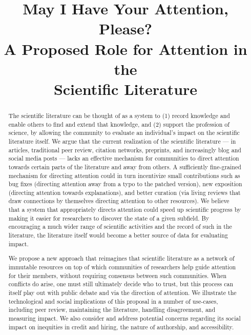 \documentclass{article} %
\title{May I Have Your Attention, Please? \\
A Proposed Role for Attention in the \\ Scientific Literature}
\begin{document}
\maketitle

\begin{abstract}
The scientific literature can be thought of as a system to 
(1) record knowledge and enable others to find and extend that knowledge, and 
(2) support the profession of science, by allowing the community to evaluate an individual's impact on the scientific literature itself.
%
We argue that the current realization of the scientific literature --- in articles, traditional peer review, citation networks, preprints, and increasingly blog and social media posts --- lacks an
effective mechanism for communities to direct attention towards certain parts of the literature and away from others. 
%
A sufficiently fine-grained mechanism for directing attention could in turn incentivize small contributions such as 
bug fixes 
(directing attention away from a typo to the patched version), 
new exposition 
(directing attention towards explanations), and 
better curation (via living reviews that draw connections by themselves directing attention to other resources).
%
We believe that a system that appropriately directs attention could speed up scientific progress by making it easier for researchers to discover the state of a given subfield.
%
By encouraging a much wider range of scientific activities and the record of such in the literature,  the literature itself would become a better source of data for evaluating impact.

We propose a new approach that reimagines that scientific literature as a network of immutable resources 
on top of which communities of researchers help guide attention for their members, 
without requiring consensus between such communities. When conflicts do arise, 
one must still ultimately decide who to trust, but this process can itself play out with public debate and via the direction of attention.
We illustrate the technological and social implications of this proposal in a number of use-cases, including peer review, maintaining the literature, handling disagreement, and measuring impact. 
We also consider and address potential concerns regarding its social impact on inequities in credit and hiring, the nature of authorship, and accessibility.
\end{abstract}
\end{document}
